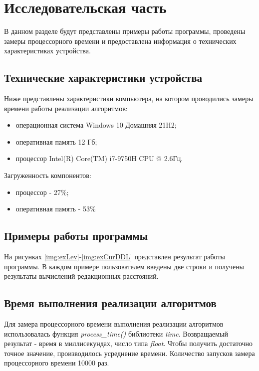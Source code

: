\chapter{Исследовательская часть}

В данном разделе будут представлены примеры работы программы, проведены замеры процессорного времени и предоставлена информация о технических характеристиках устройства.

\section{Технические характеристики устройства}

Ниже представлены характеристики компьютера, на котором проводились замеры времени  работы реализации алгоритмов:

\begin{itemize}
    \item операционная система Windows 10 Домашняя 21H2;
    \item оперативная память 12 Гб;
    \item процессор Intel(R) Core(TM) i7-9750H CPU @ 2.6Гц.
\end{itemize}

Загруженность компонентов:

\begin{itemize}
    \item процессор - 27\%;
    \item оперативная память - 53\%
\end{itemize}


\section{Примеры работы программы}

На рисунках \ref{img:exLev}-\ref{img:exCurDDL} представлен результат работы программы. В каждом примере пользователем введены две строки и получены результаты вычислений редакционных расстояний.

\clearpage


\section{Время выполнения реализации алгоритмов}

Для замера процессорного времени выполнения реализации алгоритмов использовалась функция \textit{process\_time()} библиотеки \textit{time}. Возвращаемый результат - время в миллисекундах, число типа \textit{float}.
Чтобы получить достаточно точное значение, производилось усреднение времени.
Количество запусков замера процессорного времени 10000 раз.


